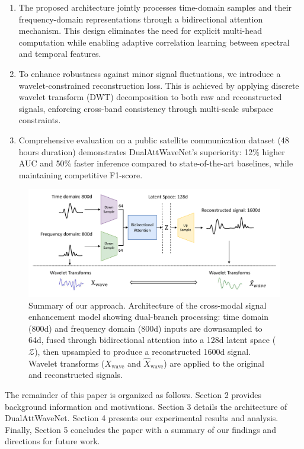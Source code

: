 \documentclass[conference]{IEEEtran}
\begin{document}
\begin{enumerate}
    \item The proposed architecture jointly processes time-domain samples and their frequency-domain representations through a bidirectional attention mechanism. This design eliminates the need for explicit multi-head computation while enabling adaptive correlation learning between spectral and temporal features.
    \item To enhance robustness against minor signal fluctuations, we introduce a wavelet-constrained reconstruction loss. This is achieved by applying discrete wavelet transform (DWT) decomposition to both raw and reconstructed signals, enforcing cross-band consistency through multi-scale subspace constraints.
    \item Comprehensive evaluation on a public satellite communication dataset (48 hours duration) demonstrates DualAttWaveNet's superiority: 12\% higher AUC and 50\% faster inference compared to state-of-the-art baselines, while maintaining competitive F1-score.
\end{enumerate}

\begin{figure}[tb]
    \centering
    \includegraphics[width=0.9\linewidth]{overview.pdf}
    \caption{Summary of our approach. Architecture of the cross-modal signal enhancement model showing dual-branch processing: time domain (800d) and frequency domain (800d) inputs are downsampled to 64d, fused through bidirectional attention into a 128d latent space ($\mathcal{Z}$), then upsampled to produce a reconstructed 1600d signal. Wavelet transforms ($X_\text{wave}$ and $\hat{X}_{\text{wave}}$) are applied to the original and reconstructed signals.}

    \label{fig:overview}
\end{figure}

The remainder of this paper is organized as follows. Section 2 provides background information and motivations. Section 3 details the architecture of DualAttWaveNet. Section 4 presents our experimental results and analysis. Finally, Section 5 concludes the paper with a summary of our findings and directions for future work.
\end{document}
